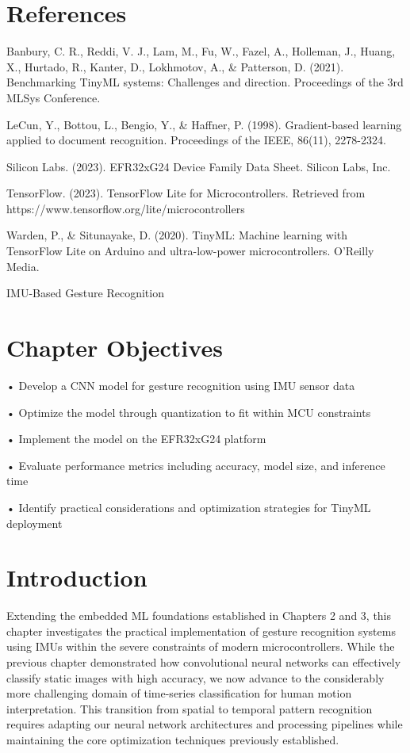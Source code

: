 \documentclass[
  9pt,
  letterpaper,
  abstract,
  titlepage]{scrbook}
\makeatletter
\renewcommand\chapter{\clearpage\global\@topnum\z@
\@afterindentfalse \secdef\@chapter\@schapter}
\newif\if@firstnumbered%
\newif\if@firstunnumbered%
\newcounter{lastRomanPage}
\let\old@chapter\chapter%
\renewcommand{\chapter}{%
  \@ifstar{\unnumbered@chapter}{\numbered@chapter}%
}
\newcommand{\numbered@chapter}[1]{%
  \if@firstnumbered%
    \cleardoublepage%
    \setcounter{lastRomanPage}{\value{page}}%
    \pagenumbering{arabic}%
    \@firstnumberedfalse%
  \else
    \setcounter{page}{\value{page}}%
  \fi
  \old@chapter{#1}%
}
\newcommand{\unnumbered@chapter}[1]{%
  \if@firstunnumbered%
    \clearpage
    \setcounter{lastRomanPage}{\value{page}}%
    \pagenumbering{roman}%
    \@firstunnumberedfalse%
  \fi
  \old@chapter*{#1}%
}
\makeatother
\begin{document}
\section{References}\label{references}

Banbury, C. R., Reddi, V. J., Lam, M., Fu, W., Fazel, A., Holleman, J.,
Huang, X., Hurtado, R., Kanter, D., Lokhmotov, A., \& Patterson, D.
(2021). Benchmarking TinyML systems: Challenges and direction.
Proceedings of the 3rd MLSys Conference.

LeCun, Y., Bottou, L., Bengio, Y., \& Haffner, P. (1998). Gradient-based
learning applied to document recognition. Proceedings of the IEEE,
86(11), 2278-2324.

Silicon Labs. (2023). EFR32xG24 Device Family Data Sheet. Silicon Labs,
Inc.

TensorFlow. (2023). TensorFlow Lite for Microcontrollers. Retrieved from
https://www.tensorflow.org/lite/microcontrollers

Warden, P., \& Situnayake, D. (2020). TinyML: Machine learning with
TensorFlow Lite on Arduino and ultra-low-power microcontrollers.
O'Reilly Media.

\chapter{IMU-Based Gesture
Recognition}\label{imu-based-gesture-recognition}

\section{Chapter Objectives}\label{chapter-objectives-2}

• Develop a CNN model for gesture recognition using IMU sensor data

• Optimize the model through quantization to fit within MCU constraints

• Implement the model on the EFR32xG24 platform

• Evaluate performance metrics including accuracy, model size, and
inference time

• Identify practical considerations and optimization strategies for
TinyML deployment

\section{Introduction}\label{introduction-1}

Extending the embedded ML foundations established in Chapters 2 and 3,
this chapter investigates the practical implementation of gesture
recognition systems using IMUs within the severe constraints of modern
microcontrollers. While the previous chapter demonstrated how
convolutional neural networks can effectively classify static images
with high accuracy, we now advance to the considerably more challenging
domain of time-series classification for human motion interpretation.
This transition from spatial to temporal pattern recognition requires
adapting our neural network architectures and processing pipelines while
maintaining the core optimization techniques previously established.
\end{document}
